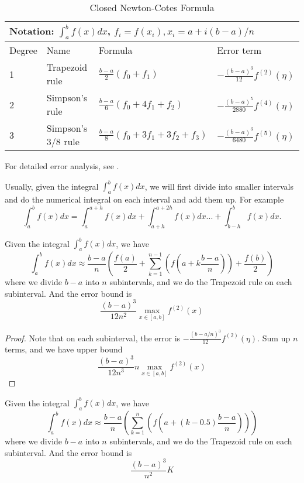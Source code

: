 \begin{refsection}
\begin{table}[H]
	\centering
	\caption{Closed Newton-Cotes Formula}
	\label{integral}
	\begin{tabular}{|l|l|l|l|}
	\hline
		\multicolumn{4}{|l|}{Notation:	$\int_a^b f(x)dx$, $f_i = f(x_i), x_i = a + i(b-a)/n$} \\ \hline
Degree	&  Name   &  Formula   &  Error term   \\ \hline
	1	&  Trapezoid rule   &  $\frac{b-a}{2}(f_0 + f_1)$   &  $-\frac{(b-a)^3}{12}f^{(2)}(\eta)$   \\ \hline
	2	&  Simpson's rule   & $\frac{b-a}{6}(f_0 + 4f_1 +  f_2)$    &   $-\frac{(b-a)^5}{2880}f^{(4)}(\eta)$   \\ \hline
	3	&  Simpson's 3/8 rule   &  $\frac{b-a}{8}(f_0 + 3f_1 + 3f_2 + f_3)$   &   $-\frac{(b-a)^3}{6480}f^{(5)}(\eta)$   \\ \hline
	\end{tabular}
\end{table}

\begin{remark}
For detailed error analysis, see \cite[252]{atkinson1989introduction}.
\end{remark}

\begin{remark}
	Usually, given the integral $\int_a^b f(x)dx$, we will first divide into smaller intervals and do the numerical integral on each interval and add them up. For example
	$$\int_a^b f(x)dx = \int_a^{a+h} f(x)dx + \int_{a+h}^{a+2h}f(x)dx ... + \int_{b-h}^b f(x)dx.$$
\end{remark}

\begin{lemma}\label{appendix:numericalintegralTrapezoidruleerrorbound}
Given the integral $\int_a^b f(x)dx$, we have
$$\int_a^b f(x)dx \approx \frac{b-a}{n}(\frac{f(a)}{2} + \sum_{k=1}^{n-1}(f(a + k\frac{b-a}{n})) + \frac{f(b)}{2} )$$
where we divide $b-a$ into $n$ subintervals, and we do the Trapezoid rule on each subinterval.
And the error bound is
$$\frac{(b-a)^3}{12n^2} \max_{x\in [a,b]} f^{(2)}(x) $$
\end{lemma}
\begin{proof}
Note that on each subinterval, the error is $-\frac{(b-a/n)^3}{12}f^{(2)}(\eta)$. Sum up $n$ terms, and we have upper bound
$$\frac{(b-a)^3}{12n^3} n \max_{x\in [a,b]} f^{(2)}(x) $$
\end{proof}

\begin{lemma}
	Given the integral $\int_a^b f(x)dx$, we have
	$$\int_a^b f(x)dx \approx \frac{b-a}{n}( \sum_{k=1}^{n}(f(a + (k-0.5)\frac{b-a}{n})) )$$
	where we divide $b-a$ into $n$ subintervals, and we do the Trapezoid rule on each subinterval.
	And the error bound is
	$$\frac{(b-a)^3}{n^2} K $$
\end{lemma}



\end{refsection}
